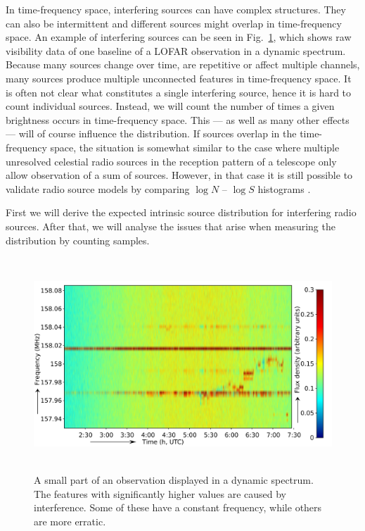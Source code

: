 \documentclass[useAMS,usenatbib]{mn2e}
\begin{document}
In time-frequency space, interfering sources can have complex structures. They can also be intermittent and different sources might overlap in time-frequency space. An example of interfering sources can be seen in Fig.~\ref{fig:dist-rfi-example}, which shows raw visibility data of one baseline of a LOFAR observation in a dynamic spectrum. Because many sources change over time, are repetitive or affect multiple channels, many sources produce multiple unconnected features in time-frequency space. It is often not clear what constitutes a single interfering source, hence it is hard to count individual sources. Instead, we will count the number of times a given brightness occurs in time-frequency space. This --- as well as many other effects --- will of course influence the distribution. If sources overlap in the time-frequency space, the situation is somewhat similar to the case where multiple unresolved celestial radio sources in the reception pattern of a telescope only allow observation of a sum of sources. However, in that case it is still possible to validate radio source models by comparing $\log N$ -- $\log S$ histograms \citep{scheuer-analysing-faint-stars}.

First we will derive the expected intrinsic source distribution for interfering radio sources. After that, we will analyse the issues that arise when measuring the distribution by counting samples.

\begin{figure}
\begin{center}
\includegraphics[height=8cm]{img/TF-L43786_L220-rfi-example-xaxistext.pdf}
\caption{A small part of an observation displayed in a dynamic spectrum. The features with significantly higher values are caused by interference. Some of these have a constant frequency, while others are more erratic.}
\label{fig:dist-rfi-example}
\end{center}
\end{figure}
\end{document}
